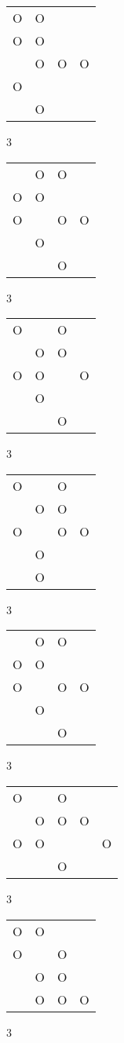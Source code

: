 \begin{tabular}{|m{0.2cm}m{0.2cm}m{0.2cm}m{0.2cm}|}\hline
O&O& & \\
O&O& & \\
 &O&O&O\\
O& & & \\
 &O& & \\
\hline\end{tabular}3
\begin{tabular}{|m{0.2cm}m{0.2cm}m{0.2cm}m{0.2cm}|}\hline
 &O&O& \\
O&O& & \\
O& &O&O\\
 &O& & \\
 & &O& \\
\hline\end{tabular}3
\begin{tabular}{|m{0.2cm}m{0.2cm}m{0.2cm}m{0.2cm}|}\hline
O& &O& \\
 &O&O& \\
O&O& &O\\
 &O& & \\
 & &O& \\
\hline\end{tabular}3
\begin{tabular}{|m{0.2cm}m{0.2cm}m{0.2cm}m{0.2cm}|}\hline
O& &O& \\
 &O&O& \\
O& &O&O\\
 &O& & \\
 &O& & \\
\hline\end{tabular}3
\begin{tabular}{|m{0.2cm}m{0.2cm}m{0.2cm}m{0.2cm}|}\hline
 &O&O& \\
O&O& & \\
O& &O&O\\
 &O& & \\
 & &O& \\
\hline\end{tabular}3
\begin{tabular}{|m{0.2cm}m{0.2cm}m{0.2cm}m{0.2cm}m{0.2cm}|}\hline
O& &O& & \\
 &O&O&O& \\
O&O& & &O\\
 & &O& & \\
\hline\end{tabular}3
\begin{tabular}{|m{0.2cm}m{0.2cm}m{0.2cm}m{0.2cm}|}\hline
O&O& & \\
O& &O& \\
 &O&O& \\
 &O&O&O\\
\hline\end{tabular}3
